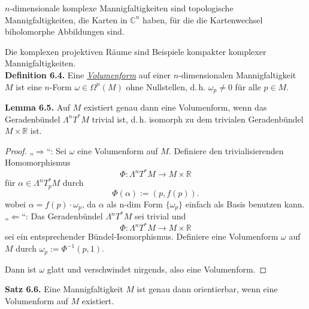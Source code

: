 \documentclass[fleqn, 12pt, letterpaper]{article}
\begin{document}
\(n\)-dimensionale komplexe Mannigfaltigkeiten sind topologische Mannigfaltigkeiten, die Karten in \( \mathbb{C}^n \) haben, für die die Kartenwechsel biholomorphe Abbildungen sind.

Die komplexen projektiven Räume sind Beispiele kompakter komplexer Mannigfaltigkeiten.\\

\textbf{Definition 6.4.}  
Eine \emph{\underline{Volumenform}} auf einer \( n \)-dimensionalen Mannigfaltigkeit \( M \) ist eine \( n \)-Form \( \omega \in \Omega^n(M) \) ohne Nullstellen, d.\,h. \( \omega_p \neq 0 \) für alle \( p \in M \).

\vspace{1em}

\textbf{Lemma 6.5.}  
Auf \( M \) existiert genau dann eine Volumenform, wenn das Geradenbündel \( \Lambda^n T^*M \) trivial ist,  
d.\,h. isomorph zu dem trivialen Geradenbündel \( M \times \mathbb{R} \) ist.

\begin{proof}
„\(\Rightarrow\)“: Sei \( \omega \) eine Volumenform auf \( M \). Definiere den trivialisierenden Homomorphismus
\[
\Phi : \Lambda^n T^*M \to M \times \mathbb{R}
\]
für \( \alpha \in \Lambda^n T^*_p M \) durch
\[
\Phi(\alpha) := (p, f(p)).
\]
wobei \(\alpha = f(p) \cdot \omega_p\), da $\alpha $ als n-dim Form $\{\omega_p\}$ einfach als Basis benutzen kann.\\

„\(\Leftarrow\)“: Das Geradenbündel \( \Lambda^n T^*M \) sei trivial und  
\[
\Phi : \Lambda^n T^*M \to M \times \mathbb{R}
\]
sei ein entsprechender Bündel-Isomorphismus. Definiere eine Volumenform \( \omega \) auf \( M \) durch \( \omega_p := \Phi^{-1}(p, 1) \).

Dann ist \( \omega \) glatt und verschwindet nirgends, also eine Volumenform.
\end{proof}

\textbf{Satz 6.6.}  
Eine Mannigfaltigkeit \( M \) ist genau dann orientierbar, wenn eine Volumenform auf \( M \) existiert.

\vspace{1em}
\end{document}
